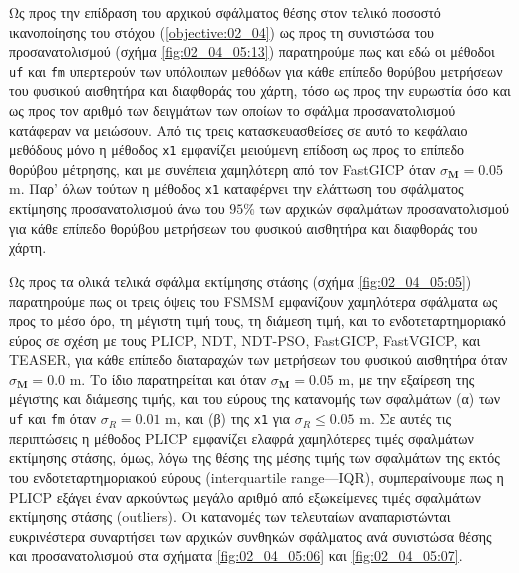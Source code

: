 Ως προς την επίδραση του αρχικού σφάλματος θέσης στον τελικό ποσοστό
ικανοποίησης του στόχου (\ref{objective:02_04}) ως προς τη συνιστώσα του
προσανατολισμού (σχήμα \ref{fig:02_04_05:13}) παρατηρούμε πως και εδώ οι
μέθοδοι \texttt{uf} και \texttt{fm} υπερτερούν των υπόλοιπων μεθόδων για κάθε
επίπεδο θορύβου μετρήσεων του φυσικού αισθητήρα και διαφθοράς του χάρτη, τόσο
ως προς την ευρωστία όσο και ως προς τον αριθμό των δειγμάτων των οποίων το
σφάλμα προσανατολισμού κατάφεραν να μειώσουν. Από τις τρεις κατασκευασθείσες σε
αυτό το κεφάλαιο μεθόδους μόνο η μέθοδος \texttt{x1} εμφανίζει μειούμενη
επίδοση ως προς το επίπεδο θορύβου μέτρησης, και με συνέπεια χαμηλότερη από τον
FastGICP όταν $\sigma_{\bm{M}} = 0.05$ m. Παρ' όλων τούτων η μέθοδος
\texttt{x1} καταφέρνει την ελάττωση του σφάλματος εκτίμησης προσανατολισμού άνω
του $95\%$ των αρχικών σφαλμάτων προσανατολισμού για κάθε επίπεδο θορύβου
μετρήσεων του φυσικού αισθητήρα και διαφθοράς του χάρτη.


Ως προς τα ολικά τελικά σφάλμα εκτίμησης στάσης (σχήμα \ref{fig:02_04_05:05})
παρατηρούμε πως οι τρεις όψεις του FSMSM εμφανίζουν χαμηλότερα σφάλματα ως προς
το μέσο όρο, τη μέγιστη τιμή τους, τη διάμεση τιμή, και το ενδοτεταρτημοριακό
εύρος σε σχέση με τους PLICP, NDT, NDT-PSO, FastGICP, FastVGICP, και TEASER,
για κάθε επίπεδο διαταραχών των μετρήσεων του φυσικού αισθητήρα όταν
$\sigma_{\bm{M}} = 0.0$ m. Το ίδιο παρατηρείται και όταν $\sigma_{\bm{M}} =
0.05$ m, με την εξαίρεση της μέγιστης και διάμεσης τιμής, και του εύρους της
κατανομής των σφαλμάτων (α) των \texttt{uf} και \texttt{fm} όταν $\sigma_R =
0.01$ m, και (β) της \texttt{x1} για $\sigma_R \leq 0.05$ m. Σε αυτές τις
περιπτώσεις η μέθοδος PLICP εμφανίζει ελαφρά χαμηλότερες τιμές σφαλμάτων
εκτίμησης στάσης, όμως, λόγω της θέσης της μέσης τιμής των σφαλμάτων της εκτός
του ενδοτεταρτημοριακού εύρους (interquartile range---IQR), συμπεραίνουμε πως η
PLICP εξάγει έναν αρκούντως μεγάλο αριθμό από εξωκείμενες τιμές σφαλμάτων
εκτίμησης στάσης (outliers). Οι κατανομές των τελευταίων αναπαριστώνται
ευκρινέστερα συναρτήσει των αρχικών συνθηκών σφάλματος ανά συνιστώσα θέσης και
προσανατολισμού στα σχήματα \ref{fig:02_04_05:06} και \ref{fig:02_04_05:07}.

